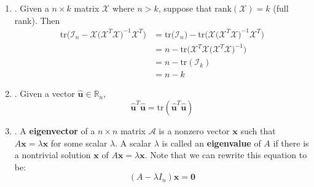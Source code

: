 \documentclass[12pt]{article}
\begin{document}
\begin{enumerate}
\begin{enumerate}
	\item\underline{}. Given a $n \times k$ matrix $\mathcal{X}$ where $n>k$, suppose that $\text{rank}(\mathcal{X})=k$ (full rank). Then 
	\begin{align*}
		\text{tr}\Big(\mathcal{I}_n - \mathcal{X}\big(\mathcal{X}^T\mathcal{X}\big)^{-1} \mathcal{X}^T \Big) &= \text{tr}\Big(\mathcal{I}_n \Big) - \text{tr}\Big(\mathcal{X}\big(\mathcal{X}^T\mathcal{X}\big)^{-1} \mathcal{X}^T \Big) \\
		& = n - \text{tr}\Big(\mathcal{X}^T\mathcal{X}\big(\mathcal{X}^T\mathcal{X}\big)^{-1}  \Big) \\
		&= n - \text{tr}(\mathcal{I}_k) \\ 
		& = n-k
	\end{align*}
	
	\item\underline{}. Given a vector $\widehat{\mathbf{u}} \in \mathbb{R}_n$, 
	\[ \widehat{\mathbf{u}}^T \widehat{\mathbf{u}} = \text{tr}( \widehat{\mathbf{u}}^T \widehat{\mathbf{u}}) \]
	

	\item\underline{}.
		A \textbf{eigenvector} of a $n\times n$ matrix $\mathcal{A}$ is a nonzero vector $\textbf{x}$ such that $A\textbf{x}=\lambda\textbf{x}$ for some scalar $\lambda$. A scalar $\lambda$ is called an \textbf{eigenvalue}
		of $A$ if there is a nontrivial solution $\textbf{x}$ of $A\textbf{x}=\lambda\textbf{x}$. Note that we can rewrite this equation to be:
			\[(A-\lambda I_n)\mathbf{x}=\mathbf{0}\]
	

\end{enumerate}
\end{enumerate}
\end{document}
